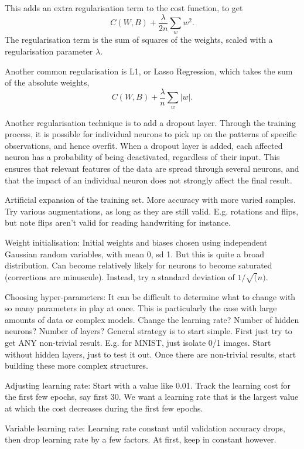 \documentclass[honours,12pt]{unswthesis}
\numberwithin{equation}{section}
\begin{document}
This adds an extra regularisation term to the cost function, to get
\[
	C(W,B) + \dfrac{\lambda}{2n}\sum_{w}w^2.
\]
The regularisation term is the sum of squares of the weights, scaled with a regularisation parameter $\lambda$. 

Another common regularisation is L1, or Lasso Regression, which takes the sum of the absolute weights,
\[
	C(W,B) + \dfrac{\lambda}{n}\sum_w|w|.
\]

Another regularisation technique is to add a dropout layer. Through the training process, it is possible for individual neurons to pick up on the patterns of specific observations, and hence overfit. When a dropout layer is added, each affected neuron has a probability of being deactivated, regardless of their input. This ensures that relevant features of the data are spread through several neurons, and that the impact of an individual neuron does not strongly affect the final result.





Artificial expansion of the training set. More accuracy with more varied samples. Try various augmentations, as long as they are still valid. E.g. rotations and flips, but note flips aren't valid for reading handwriting for instance.

Weight initialisation: Initial weights and biases chosen using independent Gaussian random variables, with mean 0, sd 1. But this is quite a broad distribution. Can become relatively likely for neurons to become saturated (corrections are minuscule). Instead, try a standard deviation of $1/\sqrt(n)$.

Choosing hyper-parameters:
It can be difficult to determine what to change with so many parameters in play at once. This is particularly the case with large amounts of data or complex models. Change the learning rate? Number of hidden neurons? Number of layers? 
General strategy is to start simple. First just try to get ANY non-trivial result. E.g. for MNIST, just isolate 0/1 images. Start without hidden layers, just to test it out. Once there are non-trivial results, start building these more complex structures.

Adjusting learning rate:
Start with a value like 0.01. Track the learning cost for the first few epochs, say first 30. We want a learning rate that is the largest value at which the cost decreases during the first few epochs.

Variable learning rate:
Learning rate constant until validation accuracy drops, then drop learning rate by a few factors. At first, keep in constant however.
\end{document}
